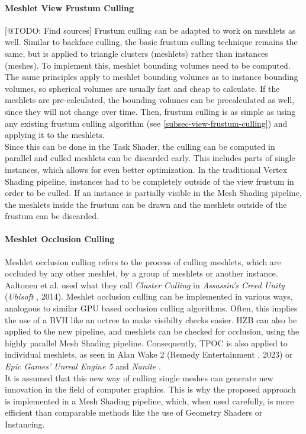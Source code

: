 \paragraph*{Meshlet View Frustum Culling} \label{subsubsec-meshlet-view-frustum-culling}

[@TODO: Find sources]
Frustum culling can be adapted to work on meshlets as well. Similar to backface culling, the basic frustum culling 
technique remains the same, but is applied to triangle clusters (meshlets) rather than instances (meshes). To 
implement this, meshlet bounding volumes need to be computed. The same principles apply to meshlet bounding volumes 
as to instance bounding volumes, so spherical volumes are usually fast and cheap to calculate. If the meshlets are 
pre-calculated, the bounding volumes can be precalculated as well, since they will not change over time. Then, frustum 
culling is as simple as using any existing frustum culling algorithm (see \ref{subsec-view-frustum-culling}) and 
applying it to the meshlets. \\

\noindent
Since this can be done in the Task Shader, the culling can be computed in parallel and 
culled meshlets can be discarded early. This includes parts of single instances, which allows for even better 
optimization. In the traditional Vertex Shading pipeline, instances had to be completely outside of the view frustum 
in order to be culled. If an instance is partially visible in the Mesh Shading pipeline, the meshlets inside the 
frustum can be drawn and the meshlets outside of the frustum can be discarded.


\paragraph*{Meshlet Occlusion Culling} \label{subsubsec-meshlet-occlusion-culling}

Meshlet occlusion culling refers to the process of culling meshlets, which are occluded by any other meshlet, by a 
group of meshlets or another instance. Aaltonen et al. \cite{Aaltonen2015} used what they call \emph{Cluster Culling} 
in \emph{Assassin's Creed Unity} (\emph{Ubisoft} \cite{Ubisoft2014}, 2014). Meshlet occlusion culling can be 
implemented in various ways, analogous to similar \ac{GPU} based occlusion culling algorithms. Often, this implies 
the use of a \ac{BVH} like an octree to make visibilty checks easier. \ac{HZB} can also be applied to the new pipeline, 
and meshlets can be checked for occlusion, using the highly parallel Mesh Shading pipeline. Consequently, \ac{TPOC} 
is also applied to individual meshlets, as seen in Alan Wake 2 (Remedy Entertainment \cite{Remedy2023}, 2023) or 
\emph{Epic Games'} \emph{Unreal Engine 5} and \emph{Nanite} \cite{Karis2021}.\\

\noindent
It is assumed that this new way of culling single meshes can generate new innovation in the field of computer graphics.
This is why the proposed approach is implemented in a Mesh Shading pipeline, which, when used carefully, is more 
efficient than comparable methods like the use of Geometry Shaders or Instancing.